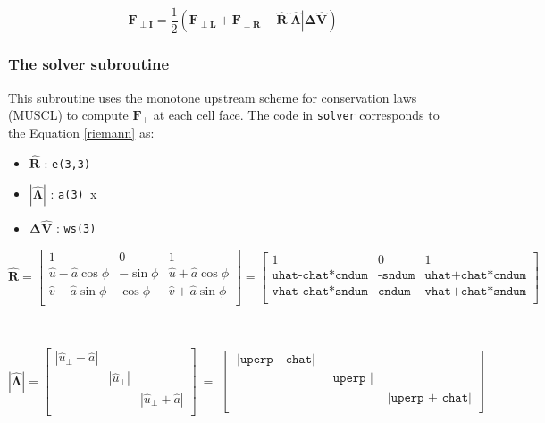 \documentclass{article}
\newcommand{\code}[1]{\texttt{#1}}
\begin{document}
\begin{equation*}
\mathbf{F_{\perp I}} =
	 \frac{1}{2} (\mathbf{F_{\perp L}} + \mathbf{F_{\perp R}} - \mathbf{\hat{R} |\hat{\Lambda}| \Delta \hat V  })
\end{equation*}


\subsubsection*{The solver subroutine}

This subroutine uses the monotone upstream scheme for conservation laws (MUSCL) to compute $\mathbf{F_\perp}$ at each cell face.  The code in \code{solver} corresponds to the Equation \ref{riemann} as: 

 \begin{itemize}
 	\item $\mathbf{\hat{R}}$ : \code{e(3,3)}
 	\item $\mathbf{|\hat{\Lambda}|}$ : \code{a(3) }x
 	\item $\mathbf{ \Delta \hat V  }  $ : \code{ws(3)} 
 \end{itemize}
 
 \[ \mathbf{\hat{R}} = 
\begin{bmatrix}
    1 &  0  & 1  \\
    \hat{u} -\hat{a} \cos{\phi} &   -\sin{\phi} & \hat{u} +\hat{a} \cos{\phi}   \\
    \hat{v} -\hat{a} \sin{\phi} &   \cos{\phi} & \hat{v} +\hat{a} \sin{\phi}    \\
\end{bmatrix} = 
\begin{bmatrix}
    1 &  0  & 1  \\
    \code{uhat-chat*cndum} &    \code{-sndum} &  \code{uhat+chat*cndum} \\
    \code{vhat-chat*sndum} &    \code{cndum} &  \code{vhat+chat*sndum} \\
\end{bmatrix}
\]

\
 
 \[ \mathbf{|\hat{\Lambda}|} = 
\begin{bmatrix}
  |\hat{u}_\perp - \hat a| &  &  \\
     &   |\hat{u}_\perp | &  \\ 
     & &  |\hat{u}_\perp  + \hat a| \\
\end{bmatrix} \ =  \
\begin{bmatrix}
 \code{ |uperp - chat|} &  &  \\
     &    \code{ |uperp |} &  \\ 
     & &   \code{ |uperp + chat|} \\
\end{bmatrix} 
\]
\end{document}
